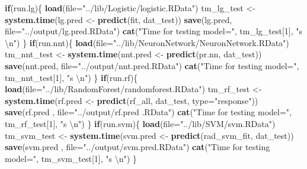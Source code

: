 \documentclass[]{article}
\newenvironment{Shaded}{\begin{snugshade}}{\end{snugshade}}
\newcommand{\KeywordTok}[1]{\textcolor[rgb]{0.13,0.29,0.53}{\textbf{#1}}}
\newcommand{\DataTypeTok}[1]{\textcolor[rgb]{0.13,0.29,0.53}{#1}}
\newcommand{\DecValTok}[1]{\textcolor[rgb]{0.00,0.00,0.81}{#1}}
\newcommand{\CharTok}[1]{\textcolor[rgb]{0.31,0.60,0.02}{#1}}
\newcommand{\StringTok}[1]{\textcolor[rgb]{0.31,0.60,0.02}{#1}}
\newcommand{\ControlFlowTok}[1]{\textcolor[rgb]{0.13,0.29,0.53}{\textbf{#1}}}
\newcommand{\NormalTok}[1]{#1}
\begin{document}
\begin{Shaded}
\begin{Highlighting}[]
\ControlFlowTok{if}\NormalTok{(run.lg)\{}
  \KeywordTok{load}\NormalTok{(}\DataTypeTok{file=}\StringTok{"../lib/Logistic/logistic.RData"}\NormalTok{)}
\NormalTok{  tm_lg_test <-}\StringTok{ }\KeywordTok{system.time}\NormalTok{(lg.pred <-}\StringTok{ }\KeywordTok{predict}\NormalTok{(fit, dat_test))}
  \KeywordTok{save}\NormalTok{(lg.pred, }\DataTypeTok{file=}\StringTok{"../output/lg.pred.RData"}\NormalTok{)}
  \KeywordTok{cat}\NormalTok{(}\StringTok{"Time for testing model="}\NormalTok{, tm_lg_test[}\DecValTok{1}\NormalTok{], }\StringTok{"s }\CharTok{\textbackslash{}n}\StringTok{"}\NormalTok{)}
\NormalTok{\}}
\ControlFlowTok{if}\NormalTok{(run.nnt)\{}
  \KeywordTok{load}\NormalTok{(}\DataTypeTok{file=}\StringTok{"../lib/NeuronNetwork/NeuronNetwork.RData"}\NormalTok{)}
\NormalTok{  tm_nnt_test <-}\StringTok{ }\KeywordTok{system.time}\NormalTok{(nnt.pred <-}\StringTok{ }\KeywordTok{predict}\NormalTok{(pr.nn, dat_test))}
  \KeywordTok{save}\NormalTok{(nnt.pred, }\DataTypeTok{file=}\StringTok{"../output/nnt.pred.RData"}\NormalTok{)}
  \KeywordTok{cat}\NormalTok{(}\StringTok{"Time for testing model="}\NormalTok{, tm_nnt_test[}\DecValTok{1}\NormalTok{], }\StringTok{"s }\CharTok{\textbackslash{}n}\StringTok{"}\NormalTok{)}
\NormalTok{\}}
\ControlFlowTok{if}\NormalTok{(run.rf)\{}
  \KeywordTok{load}\NormalTok{(}\DataTypeTok{file=}\StringTok{"../lib/RandomForest/randomforest.RData"}\NormalTok{)}
\NormalTok{  tm_rf_test <-}\StringTok{ }\KeywordTok{system.time}\NormalTok{(rf.pred <-}\StringTok{ }\KeywordTok{predict}\NormalTok{(rf_all, dat_test, }\DataTypeTok{type=}\StringTok{"response"}\NormalTok{))}
  \KeywordTok{save}\NormalTok{(rf.pred , }\DataTypeTok{file=}\StringTok{"../output/rf.pred .RData"}\NormalTok{)}
  \KeywordTok{cat}\NormalTok{(}\StringTok{"Time for testing model="}\NormalTok{, tm_rf_test[}\DecValTok{1}\NormalTok{], }\StringTok{"s }\CharTok{\textbackslash{}n}\StringTok{"}\NormalTok{)}
\NormalTok{\}}
\ControlFlowTok{if}\NormalTok{(run.svm)\{}
  \KeywordTok{load}\NormalTok{(}\DataTypeTok{file=}\StringTok{"../lib/SVM/svm.RData"}\NormalTok{)}
\NormalTok{  tm_svm_test <-}\StringTok{ }\KeywordTok{system.time}\NormalTok{(svm.pred <-}\StringTok{ }\KeywordTok{predict}\NormalTok{(rad_svm_fit, dat_test))}
  \KeywordTok{save}\NormalTok{(svm.pred , }\DataTypeTok{file=}\StringTok{"../output/svm.pred.RData"}\NormalTok{)}
  \KeywordTok{cat}\NormalTok{(}\StringTok{"Time for testing model="}\NormalTok{, tm_svm_test[}\DecValTok{1}\NormalTok{], }\StringTok{"s }\CharTok{\textbackslash{}n}\StringTok{"}\NormalTok{)}
\NormalTok{\}}
\end{Highlighting}
\end{Shaded}
\end{document}
